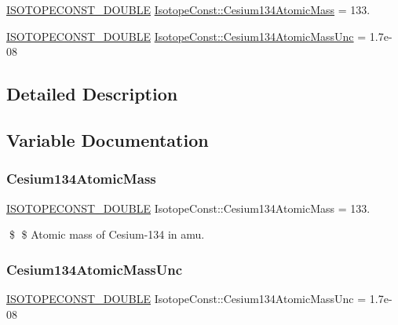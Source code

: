 \begin{DoxyCompactItemize}
\item 
\mbox{\hyperlink{group___isotope_const-_macros_ga8f45a7272ce02c0b4c65c44636ed719a}{I\+S\+O\+T\+O\+P\+E\+C\+O\+N\+S\+T\+\_\+\+D\+O\+U\+B\+LE}} \mbox{\hyperlink{group___isotope_const-_cesium-_cs134_ga7528ec6385c470af0359cd682c371693}{Isotope\+Const\+::\+Cesium134\+Atomic\+Mass}} = 133.
\item 
\mbox{\hyperlink{group___isotope_const-_macros_ga8f45a7272ce02c0b4c65c44636ed719a}{I\+S\+O\+T\+O\+P\+E\+C\+O\+N\+S\+T\+\_\+\+D\+O\+U\+B\+LE}} \mbox{\hyperlink{group___isotope_const-_cesium-_cs134_gac197b3fe7b7ecc452bfaf6b4b0e2ab94}{Isotope\+Const\+::\+Cesium134\+Atomic\+Mass\+Unc}} = 1.\+7e-\/08
\end{DoxyCompactItemize}


\subsection{Detailed Description}


\subsection{Variable Documentation}
\mbox{\label{group___isotope_const-_cesium-_cs134_ga7528ec6385c470af0359cd682c371693}} 
\subsubsection{\texorpdfstring{Cesium134\+Atomic\+Mass}{Cesium134AtomicMass}}
{\footnotesize\ttfamily \mbox{\hyperlink{group___isotope_const-_macros_ga8f45a7272ce02c0b4c65c44636ed719a}{I\+S\+O\+T\+O\+P\+E\+C\+O\+N\+S\+T\+\_\+\+D\+O\+U\+B\+LE}} Isotope\+Const\+::\+Cesium134\+Atomic\+Mass = 133.}

\$ \$ Atomic mass of Cesium-\/134 in amu. \mbox{\label{group___isotope_const-_cesium-_cs134_gac197b3fe7b7ecc452bfaf6b4b0e2ab94}} 
\subsubsection{\texorpdfstring{Cesium134\+Atomic\+Mass\+Unc}{Cesium134AtomicMassUnc}}
{\footnotesize\ttfamily \mbox{\hyperlink{group___isotope_const-_macros_ga8f45a7272ce02c0b4c65c44636ed719a}{I\+S\+O\+T\+O\+P\+E\+C\+O\+N\+S\+T\+\_\+\+D\+O\+U\+B\+LE}} Isotope\+Const\+::\+Cesium134\+Atomic\+Mass\+Unc = 1.\+7e-\/08}

